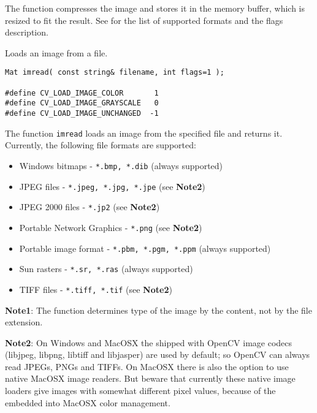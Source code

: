 The function compresses the image and stores it in the memory buffer, which is resized to fit the result.
See  for the list of supported formats and the flags description.


\label{imread}
Loads an image from a file.

\begin{lstlisting}
Mat imread( const string& filename, int flags=1 );

#define CV_LOAD_IMAGE_COLOR       1
#define CV_LOAD_IMAGE_GRAYSCALE   0
#define CV_LOAD_IMAGE_UNCHANGED  -1
\end{lstlisting}

\begin{description}
\end{description}

The function \texttt{imread} loads an image from the specified file and returns it. Currently, the following file formats are supported:
\begin{itemize}
\item Windows bitmaps - \texttt{*.bmp, *.dib} (always supported)
\item JPEG files - \texttt{*.jpeg, *.jpg, *.jpe} (see \textbf{Note2})
\item JPEG 2000 files - \texttt{*.jp2} (see \textbf{Note2})
\item Portable Network Graphics - \texttt{*.png}  (see \textbf{Note2})
\item Portable image format - \texttt{*.pbm, *.pgm, *.ppm} (always supported)
\item Sun rasters - \texttt{*.sr, *.ras} (always supported)
\item TIFF files - \texttt{*.tiff, *.tif}  (see \textbf{Note2})
\end{itemize}

\textbf{Note1}: The function determines type of the image by the content, not by the file extension.

\textbf{Note2}: On Windows and MacOSX the shipped with OpenCV image codecs (libjpeg, libpng, libtiff and libjasper) are used by default; so OpenCV can always read JPEGs, PNGs and TIFFs. On MacOSX there is also the option to use native MacOSX image readers. But beware that currently these native image loaders give images with somewhat different pixel values, because of the embedded into MacOSX color management.

